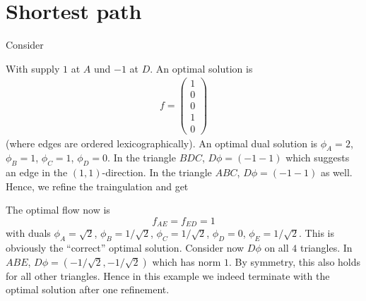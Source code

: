 \documentclass[10pt,a4paper]{article}
\begin{document}
\section{Shortest path}
Consider
\begin{center}

\end{center}
With supply $1$ at $A$ und $-1$ at $D$. An optimal solution is
\begin{align*}
f = \begin{pmatrix}
1\\0\\0\\1\\0
\end{pmatrix}
\end{align*}
(where edges are ordered lexicographically). An optimal dual solution is $\phi_A = 2$, $\phi_B = 1$, $\phi_C = 1$, $\phi_D = 0$. In the triangle $BDC$, $D\phi = (-1 -1)$ which suggests an edge in the $(1,1)$-direction. In the triangle $ABC$, $D\phi = (-1 -1)$ as well. Hence, we refine the traingulation and get
\begin{center}
\end{center}
The optimal flow now is
\[
f_{AE}=f_{ED}=1
\]
with duals $\phi_A = \sqrt{2}$, $\phi_B = 1/\sqrt{2}$, $\phi_C = 1/\sqrt{2}$, $\phi_D = 0$, $\phi_E = 1/\sqrt{2}$. This is obviously the ``correct'' optimal solution. Consider now $D\phi$ on all $4$ triangles. In $ABE$, $D\phi = (-1/\sqrt{2},-1/\sqrt{2})$ which has norm $1$. By symmetry, this also holds for all other triangles. Hence in this example we indeed terminate with the optimal solution after one refinement.
\end{document}
